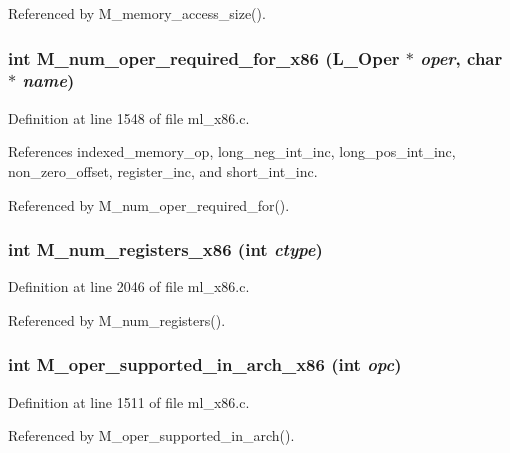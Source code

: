 Referenced by M\_\-memory\_\-access\_\-size().
\subsubsection{\setlength{\rightskip}{0pt plus 5cm}int M\_\-num\_\-oper\_\-required\_\-for\_\-x86 (L\_\-Oper $\ast$ {\em oper}, char $\ast$ {\em name})}\label{ml__x86_8c_750d107a95607390f070d2ad36039bb1}




Definition at line 1548 of file ml\_\-x86.c.

References indexed\_\-memory\_\-op, long\_\-neg\_\-int\_\-inc, long\_\-pos\_\-int\_\-inc, non\_\-zero\_\-offset, register\_\-inc, and short\_\-int\_\-inc.

Referenced by M\_\-num\_\-oper\_\-required\_\-for().
\subsubsection{\setlength{\rightskip}{0pt plus 5cm}int M\_\-num\_\-registers\_\-x86 (int {\em ctype})}\label{ml__x86_8c_87cb8eb46758138b05912f0a8cf8d671}




Definition at line 2046 of file ml\_\-x86.c.

Referenced by M\_\-num\_\-registers().
\subsubsection{\setlength{\rightskip}{0pt plus 5cm}int M\_\-oper\_\-supported\_\-in\_\-arch\_\-x86 (int {\em opc})}\label{ml__x86_8c_4fdc9b50549bb601d2ba3e96a20cdc6a}




Definition at line 1511 of file ml\_\-x86.c.

Referenced by M\_\-oper\_\-supported\_\-in\_\-arch().
